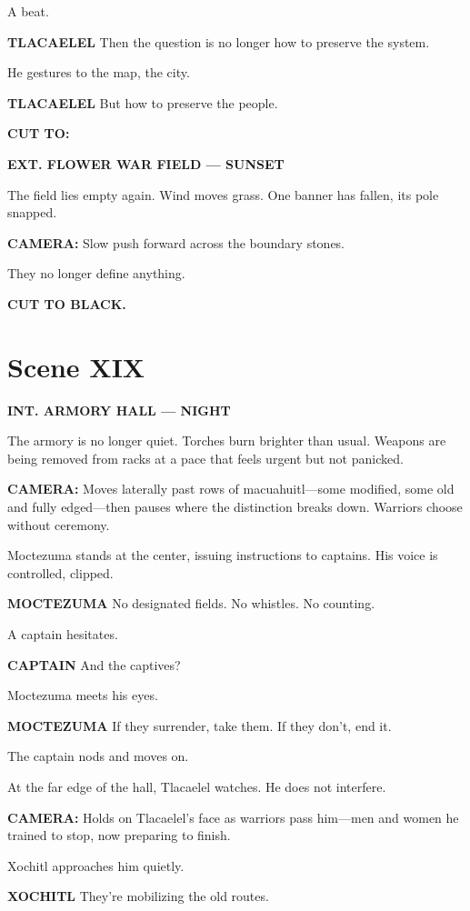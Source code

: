 \documentclass[12pt]{article}
\begin{document}
A beat.

\textbf{TLACAELEL}  
Then the question is no longer  
how to preserve the system.

He gestures to the map, the city.

\textbf{TLACAELEL}  
But how to preserve the people.

\textbf{CUT TO:}

\textbf{EXT. FLOWER WAR FIELD — SUNSET}

The field lies empty again. Wind moves grass. One banner has fallen, its pole snapped.

\textbf{CAMERA:} Slow push forward across the boundary stones.

They no longer define anything.

\textbf{CUT TO BLACK.}

\section*{Scene XIX}

\textbf{INT. ARMORY HALL — NIGHT}

The armory is no longer quiet. Torches burn brighter than usual. Weapons are being removed from racks at a pace that feels urgent but not panicked.

\textbf{CAMERA:} Moves laterally past rows of macuahuitl—some modified, some old and fully edged—then pauses where the distinction breaks down. Warriors choose without ceremony.

Moctezuma stands at the center, issuing instructions to captains. His voice is controlled, clipped.

\textbf{MOCTEZUMA}  
No designated fields.  
No whistles.  
No counting.

A captain hesitates.

\textbf{CAPTAIN}  
And the captives?

Moctezuma meets his eyes.

\textbf{MOCTEZUMA}  
If they surrender, take them.  
If they don’t, end it.

The captain nods and moves on.

At the far edge of the hall, Tlacaelel watches. He does not interfere.

\textbf{CAMERA:} Holds on Tlacaelel’s face as warriors pass him—men and women he trained to stop, now preparing to finish.

Xochitl approaches him quietly.

\textbf{XOCHITL}  
They’re mobilizing the old routes.
\end{document}
